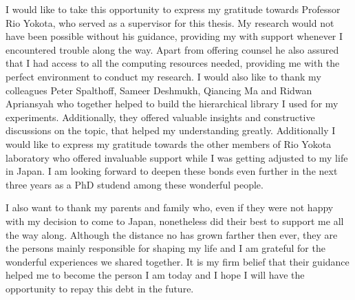 I would like to take this opportunity to express my gratitude towards Professor Rio Yokota, who served as a supervisor for this thesis. My research would not have been possible without his guidance, providing my with support whenever I encountered trouble along the way. Apart from offering counsel he also assured that I had access to all the computing resources needed, providing me with the perfect environment to conduct my research. I would also like to thank my colleagues Peter Spalthoff, Sameer Deshmukh, Qiancing Ma and Ridwan Apriansyah who together helped to build the hierarchical library I used for my experiments. Additionally, they offered valuable insights and constructive discussions on the topic, that helped my understanding greatly. Additionally I would like to express my gratitude towards the other members of Rio Yokota laboratory who offered invaluable support while I was getting adjusted to my life in Japan. I am looking forward to deepen these bonds even further in the next three years as a PhD studend among these wonderful people.

I also want to thank my parents and family who, even if they were not happy with my decision to come to Japan, nonetheless did their best to support me all the way along. Although the distance no has grown farther then ever, they are the persons mainly responsible for shaping my life and I am grateful for the wonderful experiences we shared together. It is my firm belief that their guidance helped me to become the person I am today and I hope I will have the opportunity to repay this debt in the future.